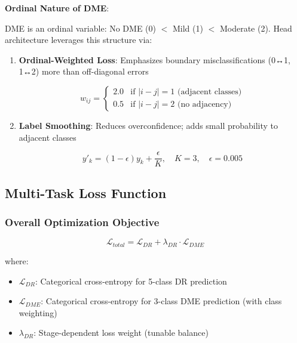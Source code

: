 \documentclass[12pt,a4paper]{article}
\begin{document}
\textbf{Ordinal Nature of DME}:

DME is an ordinal variable: No DME (0) $<$ Mild (1) $<$ Moderate (2). Head architecture leverages this structure via:

\begin{enumerate}
    \item \textbf{Ordinal-Weighted Loss}: Emphasizes boundary misclassifications (0↔1, 1↔2) more than off-diagonal errors
    
    \begin{equation}
    w_{ij} = \begin{cases}
    2.0 & \text{if } |i - j| = 1 \text{ (adjacent classes)} \\
    0.5 & \text{if } |i - j| = 2 \text{ (no adjacency)}
    \end{cases}
    \end{equation}
    
    \item \textbf{Label Smoothing}: Reduces overconfidence; adds small probability to adjacent classes
    
    \begin{equation}
    y'_k = (1 - \epsilon) y_k + \frac{\epsilon}{K}, \quad K=3, \quad \epsilon=0.005
    \end{equation}
\end{enumerate}

\subsection{Multi-Task Loss Function}

\subsubsection{Overall Optimization Objective}

\begin{equation}
\mathcal{L}_{total} = \mathcal{L}_{DR} + \lambda_{DR} \cdot \mathcal{L}_{DME}
\end{equation}

where:
\begin{itemize}
    \item $\mathcal{L}_{DR}$: Categorical cross-entropy for 5-class DR prediction
    \item $\mathcal{L}_{DME}$: Categorical cross-entropy for 3-class DME prediction (with class weighting)
    \item $\lambda_{DR}$: Stage-dependent loss weight (tunable balance)
\end{itemize}
\end{document}
